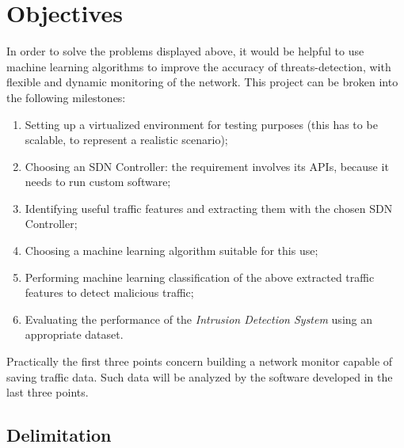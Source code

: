
\section{Objectives}
\label{sec:objectives}

In order to solve the problems displayed above, it would be helpful to use machine learning algorithms to improve the accuracy of threats-detection, with flexible and dynamic monitoring of the network. This project can be broken into the following milestones:

\begin{enumerate}
    \item Setting up a virtualized environment for testing purposes (this has to be scalable, to represent a realistic scenario);
    \item Choosing an SDN Controller: the requirement involves its APIs, because it needs to run custom software;
    \item Identifying useful traffic features and extracting them with the chosen SDN Controller;
    \item Choosing a machine learning algorithm suitable for this use;
    \item Performing machine learning classification of the above extracted traffic features to detect malicious traffic;
    \item Evaluating the performance of the \textit{Intrusion Detection System} using an appropriate dataset.
\end{enumerate}
Practically the first three points concern building a network monitor capable of saving traffic data. Such data will be analyzed by the software developed in the last three points.


\subsection{Delimitation}
\label{subsec:delimitation}

\lipsum[1]

